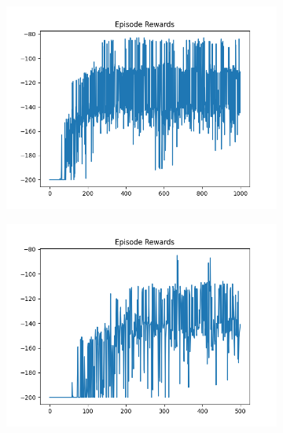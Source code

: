 \begin{figure}[H]
\begin{subfigure}{.47\linewidth}
        \includegraphics[width=\textwidth]{mountain/2024-06-15_12-23-27_dqn_mountaincar_episode_rewards.png}
    \end{subfigure}
    \begin{subfigure}{.47\linewidth}
        \centering
        \includegraphics[width=\textwidth]{mountain/2024-06-15_13-20-27_dqn_mountaincar_episode_rewards.png}
    \end{subfigure}
\end{figure}
